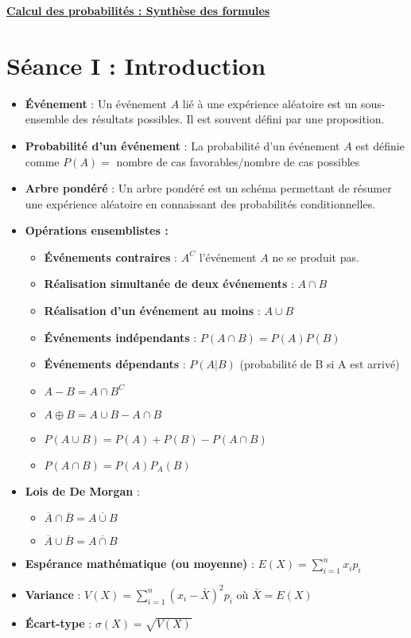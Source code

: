 \documentclass[a4paper,11pt]{report}
\begin{document}
\renewcommand{\labelitemi}{$\cdot$}
\renewcommand{\labelitemii}{$\diamond$}
\renewcommand{\labelitemiii}{$\cdot$}
\begin{Large}\begin{center} 
   \underline{\textbf{Calcul des probabilités : Synthèse des formules}} 
\end{center}\end{Large}

\section{Séance I : Introduction}
\begin{itemize}
	\item \textbf{Événement} : Un événement $A$ lié à une expérience aléatoire est un sous-ensemble des résultats possibles. Il est souvent défini par une proposition.
	\item \textbf{Probabilité d'un événement} : La probabilité d'un événement $A$ est définie comme $P(A)=$ nombre de cas favorables$/$nombre de cas possibles
	\item \textbf{Arbre pondéré} : Un arbre pondéré est un schéma permettant de résumer une expérience aléatoire en connaissant des probabilités conditionnelles.
	\item \textbf{Opérations ensemblistes :}
		\begin{itemize}
			\item \textbf{Événements contraires} : $A^C$ l'événement $A$ ne se produit pas.
			\item \textbf{Réalisation simultanée de deux événements} : $A \cap B$
			\item \textbf{Réalisation d'un événement au moins} : $A \cup B$
			\item \textbf{Événements indépendants} : $P(A \cap B) = P(A) P(B)$
			\item \textbf{Événements dépendants} : $P(A|B)$ (probabilité de B si A est arrivé)
			\item $A - B = A \cap B^C$
			\item $A \oplus B = A \cup B - A \cap B$
			\item $P(A \cup B) = P(A)+P(B)-P(A \cap B)$
			\item $P(A \cap B) = P(A)P_A(B)$
		\end{itemize}
	\item \textbf{Lois de De Morgan} :
		\begin{itemize}
			\item $\overline{A} \cap \overline{B} = \overline{A \cup B}$
			\item $\overline{A} \cup \overline{B} = \overline{A \cap B}$
		\end{itemize}
	\item \textbf{Espérance mathématique (ou moyenne)} : $E(X)=\sum\limits_{i=1}^{n}{x_ip_i}$
	\item \textbf{Variance} : $V(X)=\sum\limits_{i=1}^{n}{(x_i-\bar{X})^2p_i}$ où $\bar{X} = E(X)$
	\item \textbf{Écart-type} : $\sigma(X) = \sqrt{V(X)}$
\end{itemize}
\end{document}
